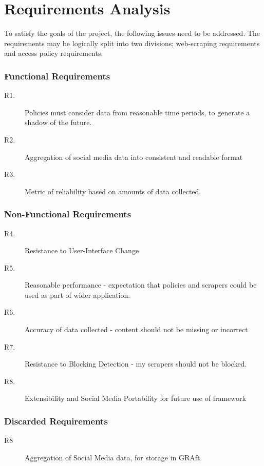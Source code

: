 \chapter{Requirements Analysis}\label{C:us}

To satisfy the goals of the project, the following issues need to be addressed. The requirements may be logically split into two divisions; web-scraping requirements and access policy requirements.

\subsection{Functional Requirements}

\begin{description}
 \item  [R1.] Policies must consider data from reasonable time periods, to generate a shadow of the future.
 \item [R2.] Aggregation of social media data into consistent and readable format
 \item [R3.] Metric of reliability based on amounts of data collected.
\end{description}

\subsection{Non-Functional Requirements}

\begin{description}
 \item [R4.] Resistance to User-Interface Change
 \item [R5.] Reasonable performance - expectation that policies and scrapers could be used as part of wider application.
 \item [R6.] Accuracy of data collected - content should not be missing or incorrect
 \item [R7.] Resistance to Blocking Detection - my scrapers should not be blocked.
 \item [R8.] Extensibility and Social Media Portability for future use of framework
\end{description}

\subsection{Discarded Requirements}

\begin{description}
 \item [R8] Aggregation of Social Media data, for storage in GRAft.
\end{description}


